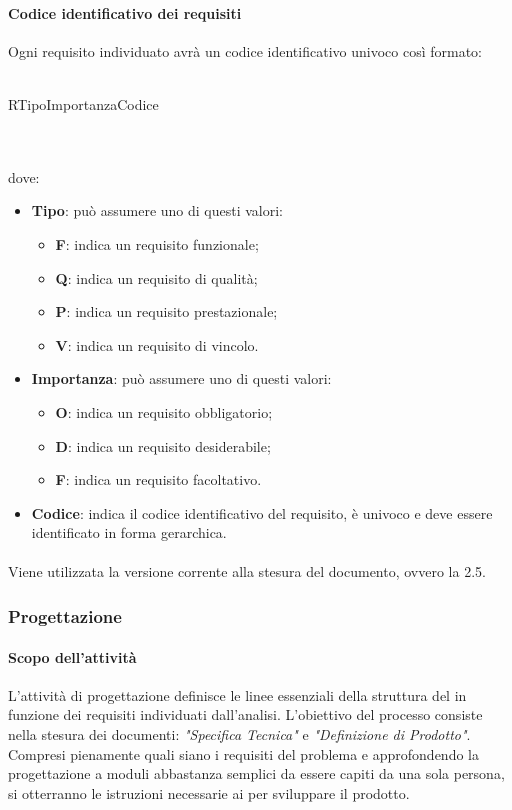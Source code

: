  \paragraph{Codice identificativo dei requisiti}
 Ogni requisito individuato avrà un codice identificativo univoco così formato: \\ \\
 \centerline{R\textbraceleft{}Tipo\textbraceright{}\textbraceleft{}Importanza\textbraceright{}\textbraceleft{}Codice\textbraceright{}}
 \\ \\
 dove:
 \begin{itemize}
 	\item \textbf{Tipo}: può assumere uno di questi valori:
 	\begin{itemize}
 		\item \textbf{F}: indica un requisito funzionale;
 		\item \textbf{Q}: indica un requisito di qualità;
 		\item \textbf{P}: indica un requisito prestazionale;
 		\item \textbf{V}: indica un requisito di vincolo.
 	\end{itemize}
 	\item \textbf{Importanza}: può assumere uno di questi valori:
 	\begin{itemize}
 		\item \textbf{O}: indica un requisito obbligatorio;
 		\item \textbf{D}: indica un requisito desiderabile;
 		\item \textbf{F}: indica un requisito facoltativo.
 	\end{itemize}
 	\item \textbf{Codice}: indica il codice identificativo del requisito, è univoco e deve essere identificato in forma gerarchica.
 \end{itemize}
 \paragraph{}
 Viene utilizzata la versione corrente alla stesura del documento, ovvero la 2.5.
 \subsubsection{Progettazione}
 \paragraph{Scopo dell'attività}
 L'attività di progettazione definisce le linee essenziali della struttura del   in
 funzione dei requisiti individuati dall'analisi. L'obiettivo del processo consiste nella stesura dei
 documenti: \textit{"Specifica Tecnica"} e \textit{"Definizione di Prodotto"}. \\
 Compresi pienamente quali siano i requisiti del problema e approfondendo la progettazione a moduli
 abbastanza semplici da essere capiti da una sola persona, si otterranno le
 istruzioni necessarie ai \PRP{} per sviluppare il prodotto.

